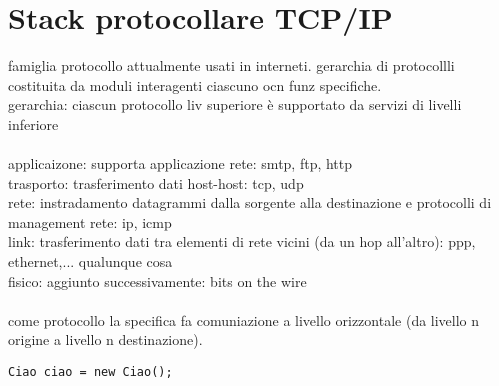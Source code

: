 \documentclass[10pt]{article}
\begin{document}
\section{Stack protocollare TCP/IP}
famiglia protocollo attualmente usati in interneti. gerarchia di protocollli costituita da moduli interagenti ciascuno ocn funz specifiche.\\
gerarchia: ciascun protocollo liv superiore è supportato da servizi di livelli inferiore\\\\
applicaizone: supporta applicazione rete: smtp, ftp, http\\
trasporto: trasferimento dati host-host: tcp, udp\\
rete: instradamento datagrammi dalla sorgente alla destinazione e protocolli di management rete: ip, icmp\\
link: trasferimento dati tra elementi di rete vicini (da un hop all'altro): ppp, ethernet,... qualunque cosa\\
fisico: aggiunto successivamente: bits on the wire\\\\
come protocollo la specifica fa comuniazione a livello orizzontale (da livello n origine a livello n destinazione).\\
\lstset{language=Java}
\begin{lstlisting}
Ciao ciao = new Ciao();
\end{lstlisting}
\end{document}

